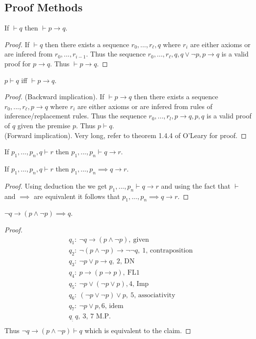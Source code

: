 \subsection{Proof Methods}
\begin{lemma}
  If $\vdash q$ then $\vdash p\to q$.
\end{lemma}
\begin{proof}
  If $\vdash q$ then there exists a sequence $r_0,...,r_\ell, q$ where $r_i$ are either axioms or are infered from $r_0,...,r_{i-1}$. Thus the sequence $r_0,...,r_\ell,q,q\lor \lnot p, p \to q$ is a valid proof for $p\to q$. Thus $\vdash p \to q$.
\end{proof}
\begin{theorem}[Deduction]
  $p \vdash q$ iff $\vdash p \to q$.
\end{theorem}
\begin{proof}
  (Backward implication). If $\vdash p\to q$ then there exists a sequence $r_0,...,r_\ell, p\to q$ where $r_i$ are either axioms or are infered from rules of inference/replacement rules. Thus the sequence $r_0,..., r_l, p\to q, p, q$ is a valid proof of $q$ given the premise $p$. Thus $p\vdash q$.\\

  (Forward implication). Very long, refer to theorem 1.4.4 of O'Leary for proof.
\end{proof}
\begin{corollary}
  If $p_1,...,p_n, q\vdash r$ then $p_1,...,p_n\vdash q\to r$.
\end{corollary}
\begin{theorem}
  If $p_1,...,p_n,q \vdash r$ then $p_1,...,p_n \implies q\to r$.
\end{theorem}
\begin{proof}
  Using deduction the we get $p_1,...,p_n \vdash q \to r$ and using the fact that $\vdash$ and $\implies$ are equivalent it follows that $p_1,...,p_n \implies q\to  r$.
\end{proof}
\begin{theorem}
  $\lnot q \to (p \land \lnot p) \implies q$.
\end{theorem}
\begin{proof}
  \begin{align*}
    &q_1:\ \lnot q\to (p\land \lnot p),\ \text{given}\\ 
    &q_2:\ \lnot (p\land \lnot p) \to \lnot \lnot q,\ \text{1, contraposition}\\
    &q_3:\ \lnot p\lor p \to q,\ \text{2, DN}\\ 
    &q_4:\ p\to (p \to p),\ \text{FL1}\\ 
    &q_5:\ \lnot p \lor (\lnot p \lor p), \text{4, Imp}\\
    &q_6:\ (\lnot p \lor \lnot p) \lor p,\ \text{5, associativity}\\
    &q_7:\ \lnot p \lor p, \text{6, idem}\\ 
    &q_:\ q,\ \text{3, 7 M.P.}\\
  \end{align*}
  Thus $\lnot q \to (p \land \lnot p) \vdash q$ which is equivalent to the claim.
\end{proof}
